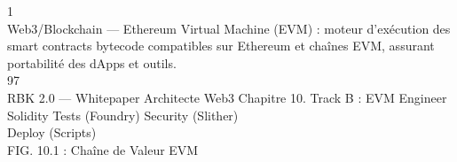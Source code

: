 \documentclass[12pt,landscape,a4paper]{article}
\begin{document}
\vspace{0.5em}
1\\
Web3/Blockchain — Ethereum Virtual Machine (EVM) : moteur d’exécution des smart contracts bytecode compatibles sur Ethereum et chaînes EVM, assurant\\
portabilité des dApps et outils.\\
\vspace{0.5em}
\vspace{0.5em}
\vspace{0.5em}
\vspace{0.5em}
97\\
RBK 2.0 — Whitepaper Architecte Web3                                                                Chapitre 10. Track B : EVM Engineer\\
\vspace{0.5em}
\vspace{0.5em}
Solidity         Tests (Foundry)        Security (Slither)\\
\vspace{0.5em}
\vspace{0.5em}
\vspace{0.5em}
Deploy (Scripts)\\
\vspace{0.5em}
FIG. 10.1 : Chaîne de Valeur EVM\\
\vspace{0.5em}
\vspace{0.5em}
\vspace{0.5em}
\end{document}
